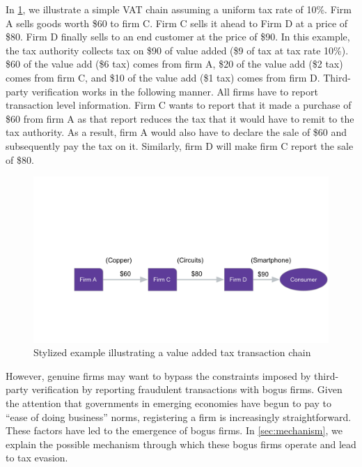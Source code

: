In \cref{fig:bogus-mechanism}, we illustrate a simple VAT chain assuming a uniform tax rate of 10\%. Firm A sells goods worth \$60 to firm C. Firm C sells it ahead to Firm D at a price of \$80. Firm D finally sells to an end customer at the price of \$90. In this example, the tax authority collects tax on \$90 of value added (\$9 of tax at tax rate 10\%). \$60 of the value add (\$6 tax) comes from firm A, \$20 of the value add (\$2 tax) comes from firm C, and \$10 of the value add (\$1 tax) comes from firm D. Third-party verification works in the following manner. All firms have to report transaction level information. Firm C wants to report that it made a purchase of \$60 from firm A as that report reduces the tax that it would have to remit to the tax authority. As a result, firm A would also have to declare the sale of \$60 and subsequently pay the tax on it. Similarly, firm D will make firm C report the sale of \$80.

\begin{figure}
  \includegraphics[width=1\columnwidth, page=2]{figures/StylizedExample_New2.pdf}
  \caption{Stylized example illustrating a value added tax transaction chain}
  \label{fig:bogus-mechanism}
\end{figure}
However, genuine firms may want to bypass the constraints imposed by third-party verification by reporting fraudulent transactions with bogus firms. Given the attention that governments in emerging economies have begun to pay to ``ease of doing business'' norms, registering a firm is increasingly straightforward. These factors have led to the emergence of bogus firms. In \cref{sec:mechanism}, we explain the possible mechanism through which these bogus firms operate and lead to tax evasion.

